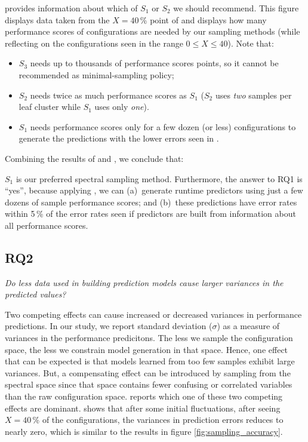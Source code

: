  provides information about which  of    $S_1$ or $S_2$ we should recommend.
This figure displays data taken from the $X=40$\,\% point of  and displays
how many performance scores of configurations are needed by our sampling methods (while
reflecting on the configurations seen in the range $0\le X \le 40$). Note that:
\begin{itemize}
\item
$S_3$ needs up to thousands of performance scores points, 
so it cannot be recommended as minimal-sampling policy;
\item $S_2$ needs twice as much performance scores as 
$S_1$ ($S_2$ uses {\em two} samples per leaf cluster  while
$S_1$ uses only {\em one}).
\item $S_1$ needs performance scores only for a few dozen (or less) configurations to generate
the predictions with the lower errors seen in .
\end{itemize}
Combining the results of  and , we conclude that:

\begin{myshadowbox}
$S_1$ is our preferred spectral sampling method. Furthermore,
the answer to RQ1 is ``yes'', because applying \what{}, we can (a)~generate runtime predictors
using just a few dozens of sample performance scores; 
and (b)~these predictions have error rates
within 5\,\% of the error rates seen if predictors are built from information about all performance scores.
\end{myshadowbox}




\subsection{RQ2}

\begin{center}
{\em
Do less data used in building prediction models cause larger variances in the predicted values?}
\end{center}


Two competing effects can cause increased or decreased  variances in 
performance predictions. In our study, we report standard deviation ($\sigma$) as a measure of variances in the performance predicitons.
The   less we sample the configuration space,
the less we constrain model generation in that space. Hence, one effect that can be expected
is that models learned
from too few samples exhibit large variances. 
But,
a  compensating effect can be introduced by sampling from the spectral space
since that space contains fewer confusing or correlated variables than the raw configuration space.
 reports which one of these two competing effects are dominant. 
 shows that after some initial fluctuations,
after seeing $X=40$\,\% of the configurations, the variances in prediction errors reduces to nearly zero, which is similar to the results in figure \ref{fig:sampling_accuracy}.


